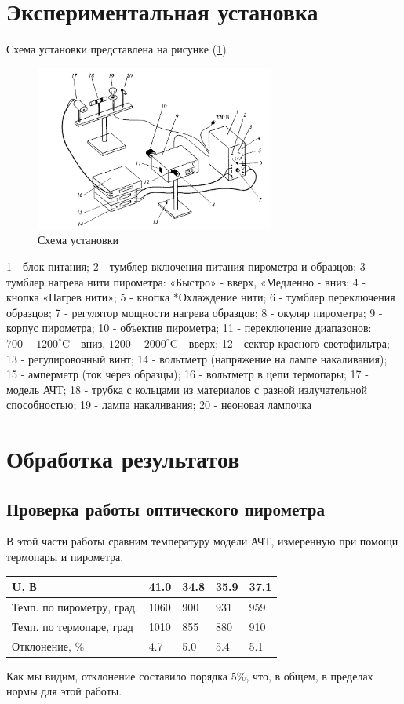 \documentclass[a4paper, 12pt]{article}
\begin{document}
\section{Экспериментальная установка}

Схема установки представлена на рисунке (\ref{fig:set})

\begin{figure}[H]
    \centering
    \includegraphics[width=0.7\textwidth]{set.jpg}
    \caption{Схема установки}
    \label{fig:set}
\end{figure}
1 - блок питания; 2 - тумблер включения питания пирометра и образцов; 3 - тумблер нагрева нити пирометра: «Быстро» - вверх, «Медленно - вниз; 4 - кнопка «Нагрев нити»; 5 - кнопка *Охлаждение нити; 6 - тумблер переключения образцов; 7 - регулятор мощности нагрева образцов; 8 - окуляр пирометра; 9 - корпус пирометра; 10 - объектив пирометра; 11 - переключение диапазонов: $700-1200^{\circ} \mathrm{C}$ - вниз, $1200-2000^{\circ} \mathrm{C}$ - вверх; 12 - сектор красного светофильтра; 13 - регулировочный винт; 14 - вольтметр (напряжение на лампе накаливания); 15 - амперметр (ток через образцы); 16 - вольтметр в цепи термопары; 17 - модель АЧТ; 18 - трубка с кольцами из материалов с разной излучательной способностью; 19 - лампа накаливания; 20 - неоновая лампочка


\section{Обработка результатов}
\subsection*{Проверка работы оптического пирометра}
В этой части работы сравним температуру модели АЧТ, измеренную при помощи термопары и пирометра.
\begin{table}[H]
	\centering
	\begin{tabular}{|l|l|l|l|l|}
	\hline
	U, В                      & 41.0 & 34.8 & 35.9 & 37.1 \\ \hline
	Темп. по пирометру, град. & 1060 & 900  & 931  & 959  \\ \hline
	Темп. по термопаре, град  & 1010 & 855  & 880  & 910  \\ \hline
	Отклонение, \%             & 4.7  & 5.0  & 5.4  & 5.1  \\ \hline
	\end{tabular}
\end{table}
Как мы видим, отклонение составило порядка 5\%, что, в общем, в пределах нормы для этой работы.
\end{document}
